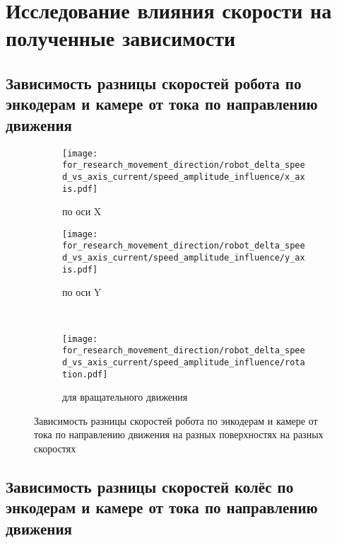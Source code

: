 \section{Исследование влияния скорости на полученные зависимости}

\subsection{Зависимость разницы скоростей робота по энкодерам и камере от тока по направлению движения}

\begin{figure}[H]
    \centering
    \begin{subfigure}{0.49\textwidth}
        \centering
        \texttt{[image: for\_research\_movement\_direction/robot\_delta\_speed\_vs\_axis\_current/speed\_amplitude\_influence/x\_axis.pdf]}
        \caption{по оси X}
    \end{subfigure}
    \hspace{0.005\textwidth}
    \begin{subfigure}{0.49\textwidth}
        \centering
        \texttt{[image: for\_research\_movement\_direction/robot\_delta\_speed\_vs\_axis\_current/speed\_amplitude\_influence/y\_axis.pdf]}
        \caption{по оси Y}
    \end{subfigure} \\
    \vspace{4pt}
    \centering
    \begin{subfigure}{0.49\textwidth}
        \centering
        \texttt{[image: for\_research\_movement\_direction/robot\_delta\_speed\_vs\_axis\_current/speed\_amplitude\_influence/rotation.pdf]}
        \caption{для вращательного движения}
    \end{subfigure}
    \caption{Зависимость разницы скоростей робота по энкодерам и камере от тока по направлению движения на разных поверхностях на разных скоростях}
\end{figure}

\subsection{Зависимость разницы скоростей колёс по энкодерам и камере от тока по направлению движения}

